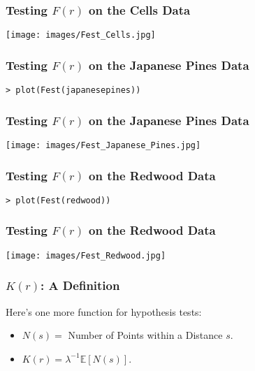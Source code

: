 \documentclass{beamer}
\begin{document}
\begin{frame}[fragile]
	\frametitle{Testing $F(r)$ on the Cells Data}

	\begin{center}
		\texttt{[image: images/Fest\_Cells.jpg]}
	\end{center}
\end{frame}

\begin{frame}[fragile]
	\frametitle{Testing $F(r)$ on the Japanese Pines Data}

	\begin{verbatim}
> plot(Fest(japanesepines))
	\end{verbatim}
\end{frame}

\begin{frame}[fragile]
	\frametitle{Testing $F(r)$ on the Japanese Pines Data}

	\begin{center}
		\texttt{[image: images/Fest\_Japanese\_Pines.jpg]}
	\end{center}
\end{frame}

\begin{frame}[fragile]
	\frametitle{Testing $F(r)$ on the Redwood Data}

	\begin{verbatim}
> plot(Fest(redwood))
	\end{verbatim}
\end{frame}

\begin{frame}[fragile]
	\frametitle{Testing $F(r)$ on the Redwood Data}

	\begin{center}
		\texttt{[image: images/Fest\_Redwood.jpg]}
	\end{center}
\end{frame}

\begin{frame}[fragile]
	\frametitle{$K(r)$: A Definition}

	Here's one more function for hypothesis tests:
	
	\begin{itemize}
		\item<1->{	$N(s) = $ Number of Points within a Distance $s$.}
		\item<2->{	$K(r) = \lambda^{-1} \mathbb{E} [N(s)]$.}
	\end{itemize}
\end{frame}
\end{document}
